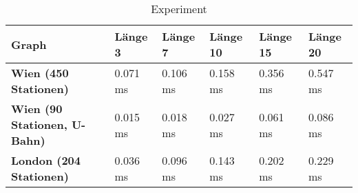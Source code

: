 \documentclass{article}
\begin{document}
\begin{table}[h]
\centering
    \begin{tabular}{|l|l|l|l|l|l|}
        \hline
        \textbf{Graph} & \textbf{Länge 3} & \textbf{Länge 7} & \textbf{Länge 10} & \textbf{Länge 15} & \textbf{Länge 20} \\ \hline
        \textbf{Wien (450 Stationen)} & 0.071 ms & 0.106 ms & 0.158 ms & 0.356 ms & 0.547 ms \\ \hline
        \textbf{Wien (90 Stationen, U-Bahn)} & 0.015 ms & 0.018 ms & 0.027 ms & 0.061 ms & 0.086 ms \\ \hline
        \textbf{London (204 Stationen)} & 0.036 ms & 0.096 ms & 0.143 ms & 0.202 ms & 0.229 ms \\ \hline
    \end{tabular}
    \caption{Experiment}
    \label{tab:experiment}
\end{table}
\end{document}

